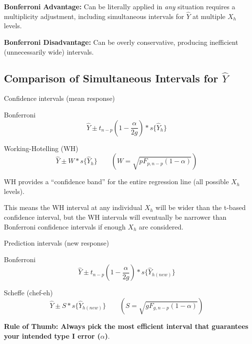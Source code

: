 \documentclass[12pt]{notes}
\begin{document}
\nspace
\bi
\item \textbf{Bonferroni Advantage:} Can be literally applied in \textit{any} situation requires a multiplicity adjustment, including simultaneous intervals for $\hat{Y}$ at multiple $X_h$ levels. 
\item \textbf{Bonferroni Disadvantage:} Can be overly conservative, producing inefficient (unnecessarily wide) intervals. 
\ei

\subsection*{Comparison of Simultaneous Intervals for $\hat{Y}$}
\bi
\item Confidence intervals (mean response)
\bi
\item Bonferroni
\[
\hat{Y} \pm t_{n-p}(1-\frac{\alpha}{2g})*s\{\hat{Y}_h\}
\]
\item Working-Hotelling (WH)
\[
\hat{Y} \pm W*s\{\hat{Y}_h\} \qquad \left(W = \sqrt{pF_{p, n-p}(1-\alpha)}\right)
\]

\begin{minipage}[l][2cm][c]{\textwidth}
\end{minipage}

\bi
\item WH provides a ``confidence band'' for the entire regression line (all possible $X_h$ levels). 
\item This means the WH interval at any individual $X_h$ will be wider than the t-based confidence interval, but the WH intervals will eventually be narrower than Bonferroni confidence intervals if enough $X_h$ are considered. 
\ei
\ei

\item Prediction intervals (new response)

\bi
\item Bonferroni
\[
\hat{Y} \pm t_{n-p}(1-\frac{\alpha}{2g})*s\{\hat{Y}_{h (new)}\}
\]
\item Scheffe (chef-eh)
\[
\hat{Y} \pm S*s\{\hat{Y}_{h (new)}\} \qquad \left(S = \sqrt{gF_{g, n-p}(1-\alpha)}\right)
\]
\ei
\ei

\textbf{Rule of Thumb: Always pick the most efficient interval that guarantees your intended type I error ($\alpha$)}. 




















\end{document}

